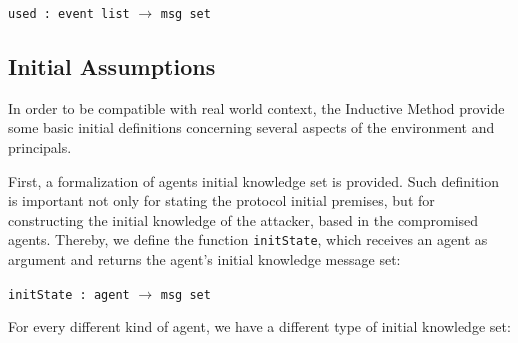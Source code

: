 \begin{center}
  \texttt{used : event list} $\longrightarrow$ \texttt{msg set}
\end{center}


\subsection{Initial Assumptions}
\label{sec:initial-assumptions}
In order to be compatible with real world context, the Inductive Method provide some basic initial definitions concerning several aspects of the environment and principals.

First, a formalization of agents initial knowledge set is provided. Such definition is important not only for stating the protocol initial premises, but for constructing the initial knowledge of the attacker, based in the compromised agents. Thereby, we define the function \texttt{initState}, which receives an agent as argument and returns the agent's initial knowledge message set:

\begin{center}
  \texttt{initState : agent} $\longrightarrow$ \texttt{msg set}
\end{center}

For every different kind of agent, we have a different type of initial knowledge set:

